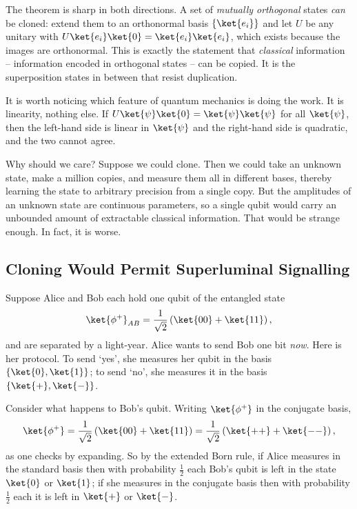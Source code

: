 The theorem is sharp in both directions. A set of \emph{mutually orthogonal} states \emph{can} be cloned: extend them to an orthonormal basis $\{\ket{e_i}\}$ and let $U$ be any unitary with $U\ket{e_i}\ket{0} = \ket{e_i}\ket{e_i}$, which exists because the images are orthonormal. This is exactly the statement that \emph{classical} information -- information encoded in orthogonal states -- can be copied. It is the superposition states in between that resist duplication.

\begin{remark}
	It is worth noticing which feature of quantum mechanics is doing the work. It is linearity, nothing else. If $U\ket{\psi}\ket{0} = \ket{\psi}\ket{\psi}$ for all $\ket{\psi}$, then the left-hand side is linear in $\ket{\psi}$ and the right-hand side is quadratic, and the two cannot agree.
\end{remark}

Why should we care? Suppose we could clone. Then we could take an unknown state, make a million copies, and measure them all in different bases, thereby learning the state to arbitrary precision from a single copy. But the amplitudes of an unknown state are continuous parameters, so a single qubit would carry an unbounded amount of extractable classical information. That would be strange enough. In fact, it is worse.

\subsection{Cloning Would Permit Superluminal Signalling}\label{sec:cloningsignal}

Suppose Alice and Bob each hold one qubit of the entangled state
$$\ket{\phi^+}_{AB} = \frac{1}{\sqrt2}\left(\ket{00} + \ket{11}\right),$$
and are separated by a light-year. Alice wants to send Bob one bit \emph{now}. Here is her protocol. To send `yes', she measures her qubit in the basis $\{\ket{0},\ket{1}\}$; to send `no', she measures it in the basis $\{\ket{+},\ket{-}\}$.

Consider what happens to Bob's qubit. Writing $\ket{\phi^+}$ in the conjugate basis,
$$\ket{\phi^+} = \frac{1}{\sqrt2}\left(\ket{00}+\ket{11}\right) = \frac{1}{\sqrt2}\left(\ket{++} + \ket{--}\right),$$
as one checks by expanding. So by the extended Born rule, if Alice measures in the standard basis then with probability $\tfrac12$ each Bob's qubit is left in the state $\ket{0}$ or $\ket{1}$; if she measures in the conjugate basis then with probability $\tfrac12$ each it is left in $\ket{+}$ or $\ket{-}$.

